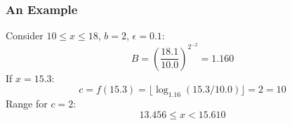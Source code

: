 \documentclass[svgnames]{beamer}
\newcommand{\floor}[1]{\ensuremath{\lfloor #1 \rfloor}}
\begin{document}

\begin{frame}
  \frametitle{An Example}
  
  \begin{exampleblock}{}
    Consider $10 \leq x \leq 18$, $b = 2$, $\epsilon = 0.1$:
    \begin{displaymath}
      B = \left(\frac{18.1}{10.0}\right)^{2^{-2}} = 1.160
    \end{displaymath}
    If $x = 15.3$:
    \begin{displaymath}
      c = f(15.3) = \floor{\log_{1.16}(15.3/10.0)} = 2 = 10
    \end{displaymath}
    Range for $c = 2$:
    \begin{displaymath}
      13.456 \leq x < 15.610
    \end{displaymath}
  \end{exampleblock}

%
%

\end{frame}

\end{document}
